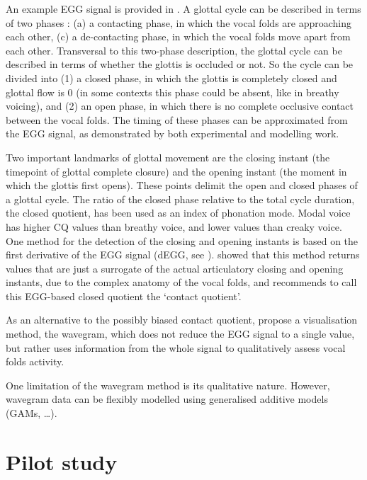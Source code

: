 \documentclass[12pt,a4paper,]{article}
\begin{document}
An example EGG signal is provided in . A glottal cycle can
be described in terms of two phases \citep{childers1985, hampala2016}:
(a) a contacting phase, in which the vocal folds are approaching each
other, (c) a de-contacting phase, in which the vocal folds move apart
from each other. Transversal to this two-phase description, the glottal
cycle can be described in terms of whether the glottis is occluded or
not. So the cycle can be divided into (1) a closed phase, in which the
glottis is completely closed and glottal flow is 0 (in some contexts
this phase could be absent, like in breathy voicing), and (2) an open
phase, in which there is no complete occlusive contact between the vocal
folds. The timing of these phases can be approximated from the EGG
signal, as demonstrated by both experimental and modelling work.

Two important landmarks of glottal movement are the closing instant (the
timepoint of glottal complete closure) and the opening instant (the
moment in which the glottis first opens). These points delimit the open
and closed phases of a glottal cycle. The ratio of the closed phase
relative to the total cycle duration, the closed quotient, has been used
as an index of phonation mode. Modal voice has higher CQ values than
breathy voice, and lower values than creaky voice. One method for the
detection of the closing and opening instants is based on the first
derivative of the EGG signal (dEGG, see ).
\citet{herbst2017} showed that this method returns values that are just
a surrogate of the actual articulatory closing and opening instants, due
to the complex anatomy of the vocal folds, and recommends to call this
EGG-based closed quotient the `contact quotient'.

As an alternative to the possibly biased contact quotient,
\citet{herbst2010} propose a visualisation method, the wavegram, which
does not reduce the EGG signal to a single value, but rather uses
information from the whole signal to qualitatively assess vocal folds
activity.

One limitation of the wavegram method is its qualitative nature.
However, wavegram data can be flexibly modelled using generalised
additive models (GAMs, \ldots{}).

\hypertarget{pilot-study}{%
\section{Pilot study}\label{pilot-study}}
\end{document}
